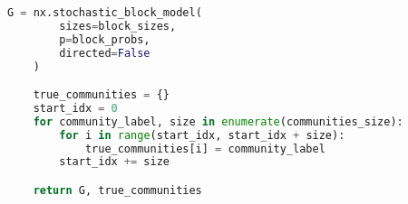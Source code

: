 \begin{appendices}
\begin{lstlisting}[language=Python, caption=Implementation of SBM for multiple groups, label=code: SBM_multi, numbers=none]
    G = nx.stochastic_block_model(
        sizes=block_sizes,
        p=block_probs,
        directed=False
    )

    true_communities = {}
    start_idx = 0
    for community_label, size in enumerate(communities_size):
        for i in range(start_idx, start_idx + size):
            true_communities[i] = community_label
        start_idx += size

    return G, true_communities
\end{lstlisting}


\newpage
\end{appendices}


